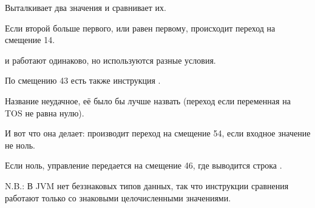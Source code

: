  Выталкивает два значения и сравнивает их.

Если второй больше первого, или равен первому, происходит переход на смещение 14.

 и  работают одинаково, но используются разные условия.

По смещению 43 есть также инструкция .

Название неудачное, её было бы лучше назвать  
(переход если переменная на \ac{TOS} не равна нулю).

И вот что она делает: производит переход на смещение 54, если входное значение не ноль.

Если ноль, управление передается на смещение 46, где выводится строка .


N.B.: В \ac{JVM} нет беззнаковых типов данных, так что инструкции сравнения работают
только со знаковыми целочисленными значениями.
